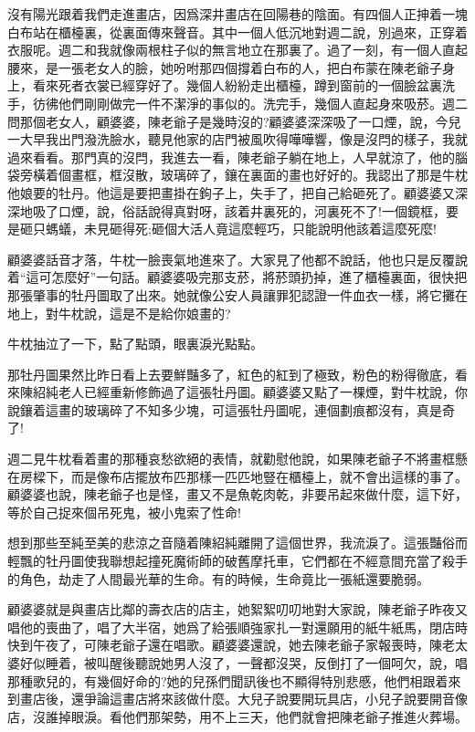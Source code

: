 \documentclass[a6paper]{article}
\begin{document}
沒有陽光跟着我們走進畫店，因爲深井畫店在回陽巷的陰面。有四個人正抻着一塊白布站在櫃檯裏，從裏面傳來聲音。其中一個人低沉地對週二說，別過來，正穿着衣服呢。週二和我就像兩根柱子似的無言地立在那裏了。過了一刻，有一個人直起腰來，是一張老女人的臉，她吩咐那四個撐着白布的人，把白布蒙在陳老爺子身上，看來死者衣裳已經穿好了。幾個人紛紛走出櫃檯，蹲到窗前的一個臉盆裏洗手，彷彿他們剛剛做完一件不潔淨的事似的。洗完手，幾個人直起身來吸菸。週二問那個老女人，顧婆婆，陳老爺子是幾時沒的?顧婆婆深深吸了一口煙，說，今兒一大早我出門潑洗臉水，聽見他家的店門被風吹得嘩嘩響，像是沒閂的樣子，我就過來看看。那門真的沒閂，我進去一看，陳老爺子躺在地上，人早就涼了，他的腦袋旁橫着個畫框，框沒散，玻璃碎了，鑲在裏面的畫也好好的。我認出了那是牛枕他娘要的牡丹。他這是要把畫掛在鉤子上，失手了，把自己給砸死了。顧婆婆又深深地吸了口煙，說，俗話說得真對呀，該着井裏死的，河裏死不了!一個鏡框，要是砸只螞蟻，未見砸得死;砸個大活人竟這麼輕巧，只能說明他該着這麼死麼!

顧婆婆話音才落，牛枕一臉喪氣地進來了。大家見了他都不說話，他也只是反覆說着“這可怎麼好”一句話。顧婆婆吸完那支菸，將菸頭扔掉，進了櫃檯裏面，很快把那張肇事的牡丹圖取了出來。她就像公安人員讓罪犯認證一件血衣一樣，將它攤在地上，對牛枕說，這是不是給你娘畫的?

牛枕抽泣了一下，點了點頭，眼裏淚光點點。

那牡丹圖果然比昨日看上去要鮮豔多了，紅色的紅到了極致，粉色的粉得徹底，看來陳紹純老人已經重新修飾過了這張牡丹圖。顧婆婆又點了一棵煙，對牛枕說，你說鑲着這畫的玻璃碎了不知多少塊，可這張牡丹圖呢，連個劃痕都沒有，真是奇了!

週二見牛枕看着畫的那種哀愁欲絕的表情，就勸慰他說，如果陳老爺子不將畫框懸在房樑下，而是像布店擺放布匹那樣一匹匹地豎在櫃檯上，就不會出這樣的事了。顧婆婆也說，陳老爺子也是怪，畫又不是魚乾肉乾，非要吊起來做什麼，這下好，等於自己捉來個吊死鬼，被小鬼索了性命!

想到那些至純至美的悲涼之音隨着陳紹純離開了這個世界，我流淚了。這張豔俗而輕飄的牡丹圖使我聯想起撞死魔術師的破舊摩托車，它們都在不經意間充當了殺手的角色，劫走了人間最光華的生命。有的時候，生命竟比一張紙還要脆弱。

顧婆婆就是與畫店比鄰的壽衣店的店主，她絮絮叨叨地對大家說，陳老爺子昨夜又唱他的喪曲了，唱了大半宿，她爲了給張順強家扎一對還願用的紙牛紙馬，閉店時快到午夜了，可陳老爺子還在唱歌。顧婆婆還說，她去陳老爺子家報喪時，陳老太婆好似睡着，被叫醒後聽說她男人沒了，一聲都沒哭，反倒打了一個呵欠，說，唱那種歌兒的，有幾個好命的?她的兒孫們聞訊後也不顯得特別悲慼，他們相跟着來到畫店後，還爭論這畫店將來該做什麼。大兒子說要開玩具店，小兒子說要開音像店，沒誰掉眼淚。看他們那架勢，用不上三天，他們就會把陳老爺子推進火葬場。
\end{document}

